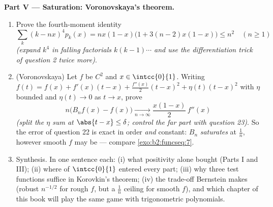 \begin{problem}
\medskip
\noindent\textbf{Part V --- Saturation: Voronovskaya's
theorem.}
\begin{enumerate}[resume]
  \item Prove the fourth-moment identity
        \[
        \sum_k (k - nx)^4 p_k(x)
        = nx(1-x)\bigl(1 + 3(n-2)x(1-x)\bigr) \leq n^2
        \quad (n \geq 1)
        \]
        \emph{(expand $k^4$ in falling factorials $k(k-1)\cdots$
        and use the differentiation trick of question 2 twice
        more)}.
  \item (Voronovskaya) Let $f$ be $C^2$ and $x \in
        \intcc{0}{1}$. Writing $f(t) = f(x) + f'(x)(t-x) +
        \frac{f''(x)}2(t-x)^2 + \eta(t)(t-x)^2$ with $\eta$
        bounded and $\eta(t) \to 0$ as $t \to x$, prove
        \[
        n\bigl(B_nf(x) - f(x)\bigr)
        \xrightarrow[n\to\infty]{}
        \frac{x(1-x)}{2}\,f''(x)
        \]
        \emph{(split the $\eta$ sum at $\abs{t - x} \leq
        \delta$; control the far part with question 23)}. So
        the error of question 22 is exact in order \emph{and}
        constant: $B_n$ \emph{saturates} at $\frac1n$, however
        smooth $f$ may be --- compare
        \cref{exo:b2:funcseq:7}.
  \item Synthesis. In one sentence each: (i) what positivity
        alone bought (Parts I and III); (ii) where 
        of $\intcc{0}{1}$ entered every part; (iii) why three
        test functions suffice in Korovkin's theorem; (iv) the
        trade-off Bernstein makes (robust $n^{-1/2}$ for rough
        $f$, but a $\frac1n$ ceiling for smooth $f$), and which
        chapter of this book will play the same game with
        trigonometric polynomials.
\end{enumerate}
\end{problem}
